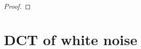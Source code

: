 \documentclass[12pt,notitlepage]{report}
\newcommand{\trans}{\mathrm{T}}	%
\DeclareMathOperator{\rank}{rank}	%
\DeclareMathOperator{\pdet}{det^\dagger}
\newcommand{\noise}{\eta}	%
\newcommand{\noiseSD}{\sigma}	%
\newcommand{\noiseVec}{\bm{\noise}}	%
\DeclareMathOperator{\Var}{Var}	%
\DeclareMathOperator{\E}{E}	%
\begin{document}
\begin{proof}
\end{proof}

\section{DCT of white noise} \label{ch:DCT of white noise}
\end{document}
